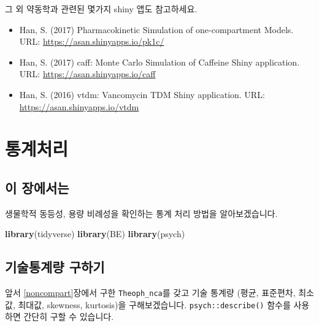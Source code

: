 \documentclass[12pt,]{krantz}
\newenvironment{Shaded}{\begin{snugshade}}{\end{snugshade}}
\newcommand{\DataTypeTok}[1]{\textcolor[rgb]{0.13,0.29,0.53}{#1}}
\newcommand{\DecValTok}[1]{\textcolor[rgb]{0.00,0.00,0.81}{#1}}
\newcommand{\KeywordTok}[1]{\textcolor[rgb]{0.13,0.29,0.53}{\textbf{#1}}}
\newcommand{\NormalTok}[1]{#1}
\newcommand{\OperatorTok}[1]{\textcolor[rgb]{0.81,0.36,0.00}{\textbf{#1}}}
\newcommand{\StringTok}[1]{\textcolor[rgb]{0.31,0.60,0.02}{#1}}
\providecommand{\tightlist}{%
  \setlength{\itemsep}{0pt}\setlength{\parskip}{0pt}}
\begin{document}
그 외 약동학과 관련된 몇가지 shiny 앱도 참고하세요.

\begin{itemize}
\tightlist
\item
  Han, S. (2017) Pharmacokinetic Simulation of one-compartment Models. URL: \url{https://asan.shinyapps.io/pk1c/}
\item
  Han, S. (2017) caff: Monte Carlo Simulation of Caffeine Shiny application. URL: \url{https://asan.shinyapps.io/caff}
\item
  Han, S. (2016) vtdm: Vancomycin TDM Shiny application. URL: \url{https://asan.shinyapps.io/vtdm}
\end{itemize}

\hypertarget{statistics}{%
\chapter{통계처리}\label{statistics}}

\hypertarget{stat-intro}{%
\section{이 장에서는}\label{stat-intro}}

생물학적 동등성, 용량 비례성을 확인하는 통계 처리 방법을 알아보겠습니다.

\begin{Shaded}
\begin{Highlighting}[]
\KeywordTok{library}\NormalTok{(tidyverse)}
\KeywordTok{library}\NormalTok{(BE)}
\KeywordTok{library}\NormalTok{(psych)}
\end{Highlighting}
\end{Shaded}

\hypertarget{stat-desc}{%
\section{기술통계량 구하기}\label{stat-desc}}

앞서 \ref{noncompart}장에서 구한 \texttt{Theoph\_nca}를 갖고 기술 통계량 (평균, 표준편차, 최소값, 최대값, skewness, kurtosis)을 구해보겠습니다. \texttt{psych::describe()} 함수를 사용하면 간단히 구할 수 있습니다.

\begin{Shaded}
\end{Shaded}
\end{document}
